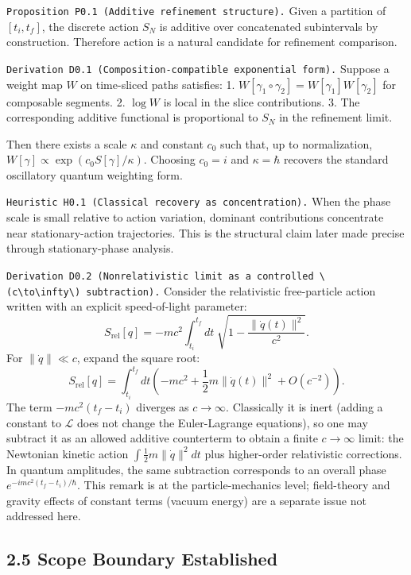\documentclass[
]{article}
\begin{document}
\texttt{Proposition\ P0.1\ (Additive\ refinement\ structure).} Given a
partition of \([t_i,t_f]\), the discrete action \(S_N\) is additive over
concatenated subintervals by construction. Therefore action is a natural
candidate for refinement comparison.

\texttt{Derivation\ D0.1\ (Composition-compatible\ exponential\ form).}
Suppose a weight map \(W\) on time-sliced paths satisfies: 1.
\(W[\gamma_1\!\circ\!\gamma_2]=W[\gamma_1]W[\gamma_2]\) for composable
segments. 2. \(\log W\) is local in the slice contributions. 3. The
corresponding additive functional is proportional to \(S_N\) in the
refinement limit.

Then there exists a scale \(\kappa\) and constant \(c_0\) such that, up
to normalization, \(W[\gamma]\propto \exp(c_0 S[\gamma]/\kappa)\).
Choosing \(c_0=i\) and \(\kappa=\hbar\) recovers the standard
oscillatory quantum weighting form.

\texttt{Heuristic\ H0.1\ (Classical\ recovery\ as\ concentration).} When
the phase scale is small relative to action variation, dominant
contributions concentrate near stationary-action trajectories. This is
the structural claim later made precise through stationary-phase
analysis.

\texttt{Derivation\ D0.2\ (Nonrelativistic\ limit\ as\ a\ controlled\ \textbackslash{}(c\textbackslash{}to\textbackslash{}infty\textbackslash{})\ subtraction).}
Consider the relativistic free-particle action written with an explicit
speed-of-light parameter: \[
S_{\mathrm{rel}}[q]
=-mc^2\int_{t_i}^{t_f} dt\;\sqrt{1-\frac{\|\dot q(t)\|^2}{c^2}}.
\] For \(\|\dot q\|\ll c\), expand the square root: \[
S_{\mathrm{rel}}[q]
=\int_{t_i}^{t_f} dt\left(-mc^2+\frac12 m\|\dot q(t)\|^2+O(c^{-2})\right).
\] The term \(-mc^2(t_f-t_i)\) diverges as \(c\to\infty\). Classically
it is inert (adding a constant to \(\mathcal L\) does not change the
Euler-Lagrange equations), so one may subtract it as an allowed additive
counterterm to obtain a finite \(c\to\infty\) limit: the Newtonian
kinetic action \(\int \frac12 m\|\dot q\|^2 dt\) plus higher-order
relativistic corrections. In quantum amplitudes, the same subtraction
corresponds to an overall phase \(e^{-imc^2(t_f-t_i)/\hbar}\). This
remark is at the particle-mechanics level; field-theory and gravity
effects of constant terms (vacuum energy) are a separate issue not
addressed here.

\hypertarget{scope-boundary-established}{%
\subsection{2.5 Scope Boundary
Established}\label{scope-boundary-established}}
\end{document}
